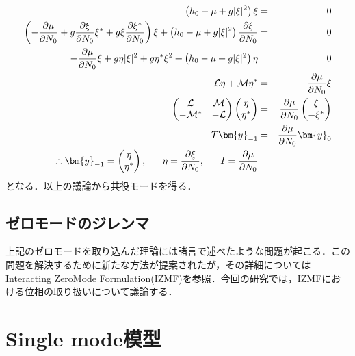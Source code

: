 \documentclass[10.5pt,a4paper]{jreport}
\begin{document}
\begin{eqnarray}
  \nonumber\left(h_0-\mu+g|\xi|^2\right)\xi&=&0\\
  \nonumber\left(-\frac{\partial\mu}{\partial N_0}+g\frac{\partial \xi}{\partial N_0}\xi^*+g\xi\frac{\partial \xi^*}{\partial N_0}\right)\xi+\left(h_0-\mu+g|\xi|^2\right)\frac{\partial \xi}{\partial N_0}&=&0\\
  \nonumber-\frac{\partial\mu}{\partial N_0}\xi+g\eta|\xi|^2+g\eta^*\xi^2+\left(h_0-\mu+g|\xi|^2\right)\eta&=&0\\
  \nonumber{\cal L}\eta + {\cal M}\eta^*&=&\frac{\partial \mu}{\partial N_0}\xi\\
  \nonumber
  \begin{pmatrix}
    {\cal L} &{\cal M}  \\
    -{\cal M^*} & -{\cal L} 
  \end{pmatrix}
  \begin{pmatrix}
    \eta \\
    \eta^* 
  \end{pmatrix}
  &=&
  \frac{\partial \mu}{\partial N_0}
  \begin{pmatrix}
    \xi \\
    -\xi^* 
  \end{pmatrix}
  \\
  \nonumber T\bm{y}_{-1} &=& \frac{\partial \mu}{\partial N_0}\bm{y}_0\\
  \therefore \bm{y}_{-1} = 
  \begin{pmatrix}
    \eta \\
    \eta^*
  \end{pmatrix},\ \ \ \ \ 
  \eta=\frac{\partial\xi}{\partial N_0},\ \ \ \ \ 
  I=\frac{\partial \mu}{\partial N_0}
\end{eqnarray}
となる．以上の議論から共役モードを得る．
\subsection{ゼロモードのジレンマ}
上記のゼロモードを取り込んだ理論には諸言で述べたような問題が起こる．この問題を解決するために新たな方法が提案されたが，その詳細についてはInteracting ZeroMode Formulation(IZMF)\cite{nakamura}を参照．今回の研究では，IZMFにおける位相の取り扱いについて議論する．

\section{Single mode模型}
\end{document}
